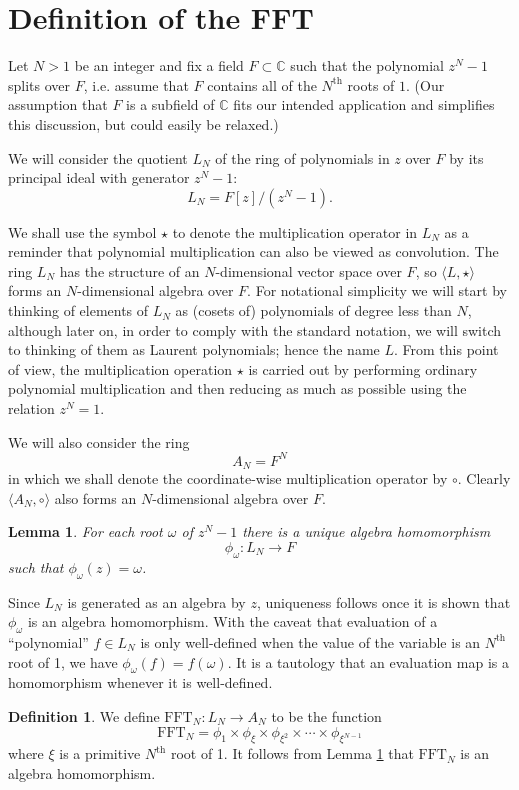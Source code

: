 \documentclass[12pt, letter, oneside]{amsart}
\theoremstyle{definition}
\newtheorem{definition}[para]{Definition}
\theoremstyle{plain}
\newtheorem{lemma}[para]{Lemma}
\numberwithin{equation}{para}
\numberwithin{figure}{section}
\newcommand{\CC}{\mathbb{C}}
\newcommand{\FFT}{\text{FFT}}
\renewcommand{\th}{\text{th}}
\begin{document}
\section{Definition of the FFT}
Let $N > 1$ be an integer and fix a field $F\subset\CC$ such that the polynomial
$z^N - 1$ splits over $F$, i.e. assume that $F$ contains all of the $N^\th$
roots of $1$.  (Our assumption that $F$ is a subfield of $\CC$ fits our intended
application and simplifies this discussion, but could easily be relaxed.)

We will consider the quotient $L_N$ of the ring of polynomials in $z$ over $F$
by its principal ideal with generator $z^N - 1$:
$$L_N = F[z]/(z^N-1).$$

We shall use the symbol $\star$ to denote the multiplication operator in $L_N$
as a reminder that polynomial multiplication can also be viewed as convolution.
The ring $L_N$ has the structure of an $N$-dimensional vector space over $F$, so
$\langle L, \star\rangle$ forms an $N$-dimensional algebra over $F$.  For
notational simplicity we will start by thinking of elements of $L_N$ as (cosets
of) polynomials of degree less than $N$, although later on, in order to comply
with the standard notation, we will switch to thinking of them as Laurent
polynomials; hence the name $L$.  From this point of view, the multiplication
operation $\star$ is carried out by performing ordinary polynomial
multiplication and then reducing as much as possible using the relation
$z^N = 1$.

We will also consider the ring $$A_N = F^N$$ in which we shall denote the
coordinate-wise multiplication operator by $\circ$.  Clearly
$\langle A_N, \circ\rangle$ also forms an $N$-dimensional algebra over $F$.

\begin{lemma}\label{lemma:evaluation}
For each root $\omega$ of $z^N - 1$ there is a unique algebra
homomorphism
$$\phi_\omega:L_N \to F$$
such that $\phi_\omega(z) = \omega$.
\end{lemma}
\proof Since $L_N$ is generated as an algebra by $z$, uniqueness
follows once it is shown that $\phi_\omega$ is an algebra
homomorphism.  With the caveat that evaluation of a ``polynomial''
$f\in L_N$ is only well-defined when the value of the variable is an
$N^\th$ root of 1, we have $\phi_\omega(f) = f(\omega)$.  It is a
tautology that an evaluation map is a homomorphism whenever it is
well-defined.
\endproof

\begin{definition}\label{definition:fft}
We define $\FFT_N:L_N \to A_N$ to be the function
$$\FFT_N = \phi_1 \times \phi_\xi \times \phi_{\xi^2} \times \cdots
\times \phi_{\xi^{N-1}}$$
where $\xi$ is a primitive $N^\th$ root of 1.  It follows from
Lemma \ref{lemma:evaluation} that $\FFT_N$ is an algebra homomorphism.
\end{definition}
\end{document}
